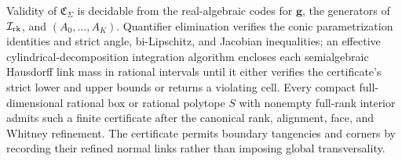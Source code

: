 Validity of \(\mathfrak C_\Sigma\) is decidable from the real-algebraic codes for \(\mathbf g\), the generators of \(\mathcal I_{\rm rk}\), and \((A_0,\ldots,A_K)\). Quantifier elimination verifies the conic parametrization identities and strict angle, bi-Lipschitz, and Jacobian inequalities; an effective cylindrical-decomposition integration algorithm encloses each semialgebraic Hausdorff link mass in rational intervals until it either verifies the certificate's strict lower and upper bounds or returns a violating cell. Every compact full-dimensional rational box or rational polytope \(S\) with nonempty full-rank interior admits such a finite certificate after the canonical rank, alignment, face, and Whitney refinement. The certificate permits boundary tangencies and corners by recording their refined normal links rather than imposing global transversality.
